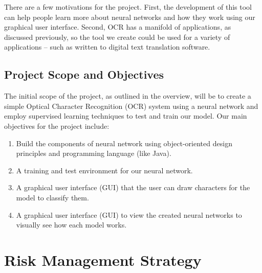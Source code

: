 \documentclass[english,12pt]{article}
\begin{document}
There are a few motivations for the project. First, the development of this tool
can help people learn more about neural networks and how they work using our graphical user interface. 
Second, OCR has a manifold of applications, as discussed previously, so the tool we create
could be used for a variety of applications -- such as written to digital
text translation software. 

\subsection{Project Scope and Objectives}
The initial scope of the project, as outlined in the overview, will be to create a simple Optical Character Recognition (OCR) system using a neural network and employ supervised learning techniques to test and train our model. Our main objectives for the project include:
\begin{enumerate}[(a.)]
  \item Build the components of neural network using object-oriented design principles and programming language (like Java).
  \item A training and test environment for our neural network.
  \item A graphical user interface (GUI) that the user can draw characters
    for the model to classify them.
  \item A graphical user interface (GUI) to view the created neural networks to
    visually see how each model works.
\end{enumerate}

\section{Risk Management Strategy}
\end{document}

